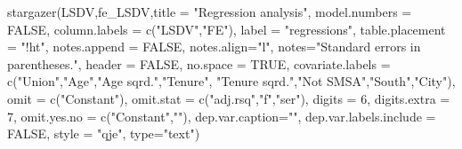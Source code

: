 \documentclass[
]{article}
\newenvironment{Shaded}{\begin{snugshade}}{\end{snugshade}}
\newcommand{\AttributeTok}[1]{\textcolor[rgb]{0.77,0.63,0.00}{#1}}
\newcommand{\ConstantTok}[1]{\textcolor[rgb]{0.00,0.00,0.00}{#1}}
\newcommand{\DecValTok}[1]{\textcolor[rgb]{0.00,0.00,0.81}{#1}}
\newcommand{\FunctionTok}[1]{\textcolor[rgb]{0.00,0.00,0.00}{#1}}
\newcommand{\NormalTok}[1]{#1}
\newcommand{\StringTok}[1]{\textcolor[rgb]{0.31,0.60,0.02}{#1}}
\begin{document}
\begin{Shaded}
\begin{Highlighting}[]
  \FunctionTok{stargazer}\NormalTok{(LSDV,fe\_LSDV,}\AttributeTok{title =} \StringTok{"Regression analysis"}\NormalTok{, }
            \AttributeTok{model.numbers =} \ConstantTok{FALSE}\NormalTok{,}
            \AttributeTok{column.labels =} \FunctionTok{c}\NormalTok{(}\StringTok{"LSDV"}\NormalTok{,}\StringTok{"FE"}\NormalTok{),}
            \AttributeTok{label =} \StringTok{"regressions"}\NormalTok{,}
            \AttributeTok{table.placement =} \StringTok{"!ht"}\NormalTok{,}
            \AttributeTok{notes.append =} \ConstantTok{FALSE}\NormalTok{,}
            \AttributeTok{notes.align=}\StringTok{"l"}\NormalTok{,}
            \AttributeTok{notes=}\StringTok{"Standard errors in parentheses."}\NormalTok{,}
            \AttributeTok{header =} \ConstantTok{FALSE}\NormalTok{,}
            \AttributeTok{no.space =} \ConstantTok{TRUE}\NormalTok{,}
            \AttributeTok{covariate.labels =} \FunctionTok{c}\NormalTok{(}\StringTok{"Union"}\NormalTok{,}\StringTok{"Age"}\NormalTok{,}\StringTok{"Age sqrd."}\NormalTok{,}\StringTok{"Tenure"}\NormalTok{,}
                                 \StringTok{"Tenure sqrd."}\NormalTok{,}\StringTok{"Not SMSA"}\NormalTok{,}\StringTok{"South"}\NormalTok{,}\StringTok{"City"}\NormalTok{),}
            \AttributeTok{omit =} \FunctionTok{c}\NormalTok{(}\StringTok{"Constant"}\NormalTok{),}
            \AttributeTok{omit.stat =} \FunctionTok{c}\NormalTok{(}\StringTok{"adj.rsq"}\NormalTok{,}\StringTok{"f"}\NormalTok{,}\StringTok{"ser"}\NormalTok{),}
            \AttributeTok{digits =} \DecValTok{6}\NormalTok{,}
            \AttributeTok{digits.extra =} \DecValTok{7}\NormalTok{,}
            \AttributeTok{omit.yes.no =} \FunctionTok{c}\NormalTok{(}\StringTok{"Constant"}\NormalTok{,}\StringTok{""}\NormalTok{),}
            \AttributeTok{dep.var.caption=}\StringTok{""}\NormalTok{,}
            \AttributeTok{dep.var.labels.include =} \ConstantTok{FALSE}\NormalTok{,}
            \AttributeTok{style =} \StringTok{"qje"}\NormalTok{,}
            \AttributeTok{type=}\StringTok{"text"}\NormalTok{)}
\end{Highlighting}
\end{Shaded}
\end{document}
